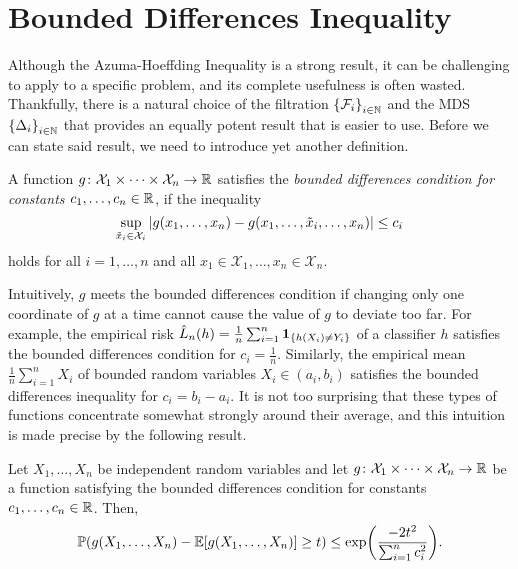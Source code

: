 \section{Bounded Differences Inequality}

Although the Azuma-Hoeffding Inequality is a strong result, it can be challenging to apply to a specific problem, and its complete usefulness is often wasted. Thankfully, there is a natural choice of the filtration $\set{\mathcal{F}_i}_{i \in \N}$ and the MDS $\set{\Delta_i}_{i \in \N}$ that provides an equally potent result that is easier to use. Before we can state said result, we need to introduce yet another definition.

\begin{definition}
A function $g \colon \mathcal{X}_1 \times \dots \times \mathcal{X}_n \to \mathbb{R}$ satisfies the \emph{bounded differences condition for constants $c_1, \dots, c_n \in \mathbb{R}$}, if the inequality
\[
    \sup_{\tilde{x}_i \in \mathcal{X}_i} \abs{g(x_1, \dots, x_n) - g(x_1, \dots, \tilde{x}_i, \dots, x_n)} \leq c_i
\]
holds for all $i = 1, \dots, n$ and all $x_1 \in \mathcal{X}_1, \dots, x_n \in \mathcal{X}_n$.
\end{definition}

Intuitively, $g$ meets the bounded differences condition if changing only one coordinate of $g$ at a time cannot cause the value of $g$ to deviate too far. For example, the empirical risk $\hat{L}_n(h) = \frac{1}{n} \sum_{i=1}^n \indSet{h(X_i) \neq Y_i}$ of a classifier $h$ satisfies the bounded differences condition for $c_i = \frac{1}{n}$. Similarly, the empirical mean $\frac{1}{n} \sum_{i=1}^n X_i$ of bounded random variables $X_i \in (a_i, b_i)$ satisfies the bounded differences inequality for $c_i = b_i - a_i$. It is not too surprising that these types of functions concentrate somewhat strongly around their average, and this intuition is made precise by the following result.

\begin{theorem}
\label{thm: bounded differences inequality}
Let $X_1, \dots, X_n$ be independent random variables and let $g \colon \mathcal{X}_1 \times \dots \times \mathcal{X}_n \to \mathbb{R}$ be a function satisfying the bounded differences condition for constants $c_1, \dots, c_n \in \mathbb{R}$. Then,
\[
    \operatorname{\mathbb{P}}(g(X_1, \dots, X_n) - \operatorname{\mathbb{E}}[g(X_1, \dots, X_n)] \geq t) \leq \exp(\frac{-2t^2}{\sum_{i=1}^n c_i^2}).
\]
\end{theorem}

